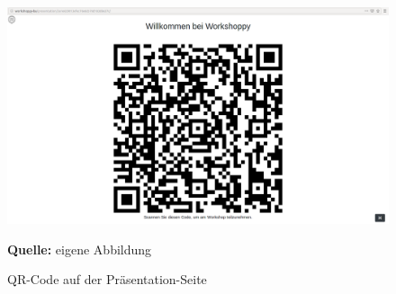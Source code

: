 \newpage
\begin{figure}[H]
  \begin{center}
    \includegraphics[scale=0.2]{img/qrcode}
	\caption{QR-Code auf der Präsentation-Seite} 
	\footnotesize\sffamily\textbf{Quelle:} eigene Abbildung
	\label{fig:präsentation-seite mit qrcode final}
  \end{center}   
\end{figure}






